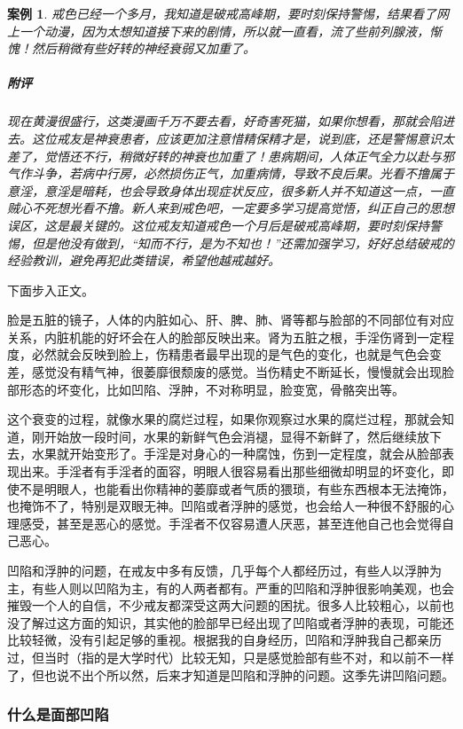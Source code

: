 \documentclass{ctexart}
\newtheorem{case}{案例}
\begin{document}
\begin{case}
    戒色已经一个多月，我知道是破戒高峰期，要时刻保持警惕，结果看了网上一个动漫，因为太想知道接下来的剧情，所以就一直看，流了些前列腺液，惭愧！然后稍微有些好转的神经衰弱又加重了。
    \subparagraph{附评} 现在黄漫很盛行，这类漫画千万不要去看，好奇害死猫，如果你想看，那就会陷进去。这位戒友是神衰患者，应该更加注意惜精保精才是，说到底，还是警惕意识太差了，觉悟还不行，稍微好转的神衰也加重了！患病期间，人体正气全力以赴与邪气作斗争，若病中行房，必然损伤正气，加重病情，导致不良后果。光看不撸属于意淫，意淫是暗耗，也会导致身体出现症状反应，很多新人并不知道这一点，一直贼心不死想光看不撸。新人来到戒色吧，一定要多学习提高觉悟，纠正自己的思想误区，这是最关键的。这位戒友知道戒色一个月后是破戒高峰期，要时刻保持警惕，但是他没有做到，“知而不行，是为不知也！”还需加强学习，好好总结破戒的经验教训，避免再犯此类错误，希望他越戒越好。
\end{case}

下面步入正文。

脸是五脏的镜子，人体的内脏如心、肝、脾、肺、肾等都与脸部的不同部位有对应关系，内脏机能的好坏会在人的脸部反映出来。肾为五脏之根，手淫伤肾到一定程度，必然就会反映到脸上，伤精患者最早出现的是气色的变化，也就是气色会变差，感觉没有精气神，很萎靡很颓废的感觉。当伤精史不断延长，慢慢就会出现脸部形态的坏变化，比如凹陷、浮肿，不对称明显，脸变宽，骨骼突出等。

这个衰变的过程，就像水果的腐烂过程，如果你观察过水果的腐烂过程，那就会知道，刚开始放一段时间，水果的新鲜气色会消褪，显得不新鲜了，然后继续放下去，水果就开始变形了。手淫是对身心的一种腐蚀，伤到一定程度，就会从脸部表现出来。手淫者有手淫者的面容，明眼人很容易看出那些细微却明显的坏变化，即使不是明眼人，也能看出你精神的萎靡或者气质的猥琐，有些东西根本无法掩饰，也掩饰不了，特别是双眼无神。凹陷或者浮肿的感觉，也会给人一种很不舒服的心理感受，甚至是恶心的感觉。手淫者不仅容易遭人厌恶，甚至连他自己也会觉得自己恶心。

凹陷和浮肿的问题，在戒友中多有反馈，几乎每个人都经历过，有些人以浮肿为主，有些人则以凹陷为主，有的人两者都有。严重的凹陷和浮肿很影响美观，也会摧毁一个人的自信，不少戒友都深受这两大问题的困扰。很多人比较粗心，以前也没了解过这方面的知识，其实他的脸部早已经出现了凹陷或者浮肿的表现，可能还比较轻微，没有引起足够的重视。根据我的自身经历，凹陷和浮肿我自己都亲历过，但当时（指的是大学时代）比较无知，只是感觉脸部有些不对，和以前不一样了，但也说不出个所以然，后来才知道是凹陷和浮肿的问题。这季先讲凹陷问题。

\subsubsection{什么是面部凹陷}
\end{document}
